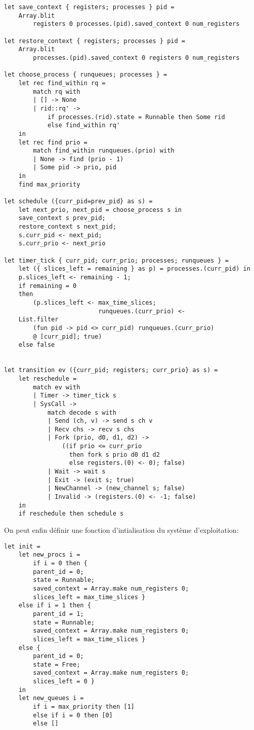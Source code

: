 \documentclass[french, toc]{../cs-classes/cs-classes}
\begin{document}
\begin{verbatim}
let save_context { registers; processes } pid =
    Array.blit
        registers 0 processes.(pid).saved_context 0 num_registers

let restore_context { registers; processes } pid =
    Array.blit
        processes.(pid).saved_context 0 registers 0 num_registers

let choose_process { runqueues; processes } =
    let rec find_within rq =
        match rq with
        | [] -> None
        | rid::rq' ->
            if processes.(rid).state = Runnable then Some rid
            else find_within rq'
    in
    let rec find prio =
        match find_within runqueues.(prio) with
        | None -> find (prio - 1)
        | Some pid -> prio, pid
    in
    find max_priority

let schedule ({curr_pid=prev_pid} as s) =
    let next_prio, next_pid = choose_process s in
    save_context s prev_pid;
    restore_context s next_pid;
    s.curr_pid <- next_pid;
    s.curr_prio <- next_prio

let timer_tick { curr_pid; curr_prio; processes; runqueues } =
    let ({ slices_left = remaining } as p) = processes.(curr_pid) in
    p.slices_left <- remaining - 1;
    if remaining = 0
    then
        (p.slices_left <- max_time_slices;
                          runqueues.(curr_prio) <-
    List.filter
        (fun pid -> pid <> curr_pid) runqueues.(curr_prio)
        @ [curr_pid]; true)
    else false


let transition ev ({curr_pid; registers; curr_prio} as s) =
    let reschedule =
        match ev with
        | Timer -> timer_tick s
        | SysCall ->
            match decode s with
            | Send (ch, v) -> send s ch v
            | Recv chs -> recv s chs
            | Fork (prio, d0, d1, d2) ->
                ((if prio <= curr_prio
                  then fork s prio d0 d1 d2
                  else registers.(0) <- 0); false)
            | Wait -> wait s
            | Exit -> (exit s; true)
            | NewChannel -> (new_channel s; false)
            | Invalid -> (registers.(0) <- -1; false)
    in
    if reschedule then schedule s
\end{verbatim}

On peut enfin définir une fonction d'intialisation du système d'exploitation:
\begin{verbatim}
let init =
    let new_procs i =
        if i = 0 then {
        parent_id = 0;
        state = Runnable;
        saved_context = Array.make num_registers 0;
        slices_left = max_time_slices }
    else if i = 1 then {
        parent_id = 1;
        state = Runnable;
        saved_context = Array.make num_registers 0;
        slices_left = max_time_slices }
    else {
        parent_id = 0;
        state = Free;
        saved_context = Array.make num_registers 0;
        slices_left = 0 }
    in
    let new_queues i =
        if i = max_priority then [1]
        else if i = 0 then [0]
        else []
\end{verbatim}
\end{document}
